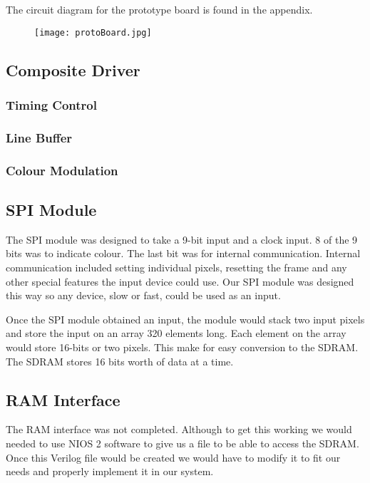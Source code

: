 The circuit diagram for the prototype board is found in the appendix.

\begin{figure}[H]
    \centering
    \texttt{[image: protoBoard.jpg]}
    \caption{}
\end{figure}

\subsection{Composite Driver}

\subsubsection{Timing Control}

\subsubsection{Line Buffer}

\subsubsection{Colour Modulation}

\subsection{SPI Module}

The SPI module was designed to take a 9-bit input and a clock input. 8 of the
9 bits was to indicate colour. The last bit was for internal communication. 
Internal communication included setting individual pixels, resetting the frame 
and any other special features the input device could use. Our SPI module was
designed this way so any device, slow or fast, could be used as an input.

Once the SPI module obtained an input, the module would stack two input pixels
and store the input on an array 320 elements long. Each element on the array 
would store 16-bits or two pixels. This make for easy conversion to the SDRAM.
The SDRAM stores 16 bits worth of data at a time.


\subsection{RAM Interface}

The RAM interface was not completed. Although to get this working we would 
needed to use NIOS 2 software to give us a file to be able to access the 
SDRAM. Once this Verilog file would be created we would have to modify it to
fit our needs and properly implement it in our system.

